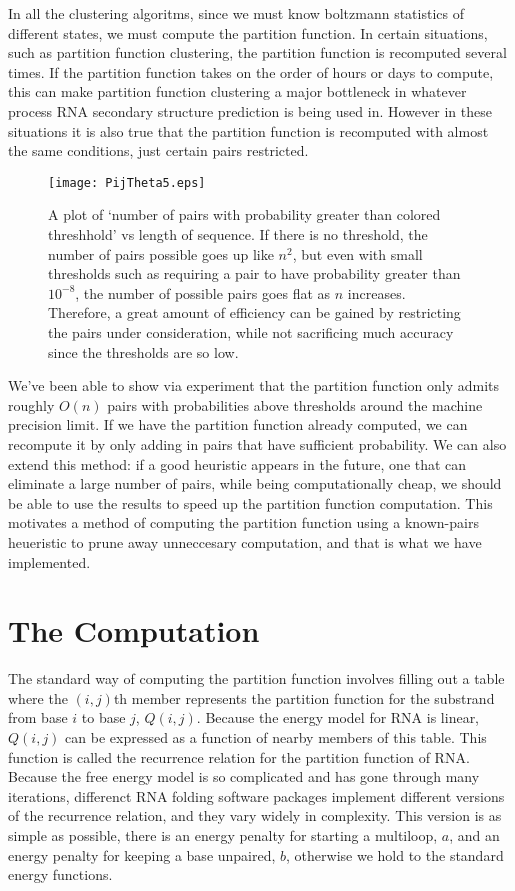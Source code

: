 In all the clustering algoritms, since we must know boltzmann
statistics of different states, we must compute the partition
function. In certain situations, such as partition function
clustering, the partition function is recomputed several times. If the
partition function takes on the order of hours or days to compute,
this can make partition function clustering a major bottleneck in
whatever process RNA secondary structure prediction is being used
in. However in these situations it is also true that the partition
function is recomputed with almost the same conditions, just certain
pairs restricted. 

\begin{figure}[t]
\centering
\texttt{[image: PijTheta5.eps]} 
\caption{A plot of `number of pairs with probability greater than
  colored threshhold' vs length of sequence. If there is no threshold,
  the number of pairs possible goes up like $n^2$, but even with small
  thresholds such as requiring a pair to have probability greater than
  $10^{-8}$, the number of possible pairs goes flat as $n$
  increases. Therefore, a great amount of efficiency can be gained by
  restricting the pairs under consideration, while not sacrificing
  much accuracy since the thresholds are so low. }
\label{fig:probThresh}
\end{figure}

We've been able to show via experiment that the partition function
only admits roughly $O(n)$ pairs with probabilities above thresholds
around the machine precision limit. If we have the partition function
already computed, we can recompute it by only adding in pairs that
have sufficient probability. We can also extend this method: if a good
heuristic appears in the future, one that can eliminate a large number
of pairs, while being computationally cheap, we should be able to use
the results to speed up the partition function computation. This
motivates a method of computing the partition function using a
known-pairs heueristic to prune away unneccesary computation, and that
is what we have implemented.

\section{The Computation}

The standard way of computing the partition function involves filling
out a table where the $(i,j)$th member represents the partition
function for the substrand from base $i$ to base $j$,
$Q(i,j)$. Because the energy model for RNA is linear, $Q(i,j)$ can be
expressed as a function of nearby members of this table. This function
is called the recurrence relation for the partition function of
RNA. Because the free energy model is so complicated and has gone
through many iterations, differenct RNA folding software packages
implement different versions of the recurrence relation, and they vary
widely in complexity. This version is as simple as possible, there is
an energy penalty for starting a multiloop, $a$, and an energy penalty
for keeping a base unpaired, $b$, otherwise we hold to the standard
energy functions.

